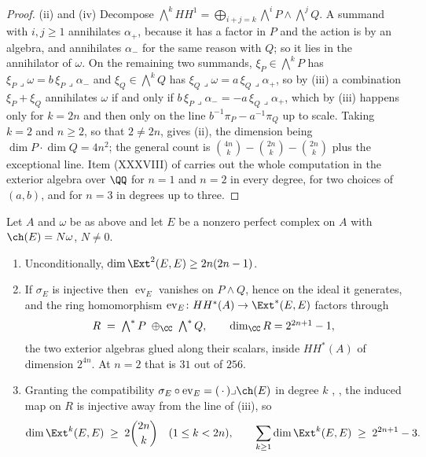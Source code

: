 \begin{proof}
(ii) and (iv) Decompose $\bigwedge^{k}HH^{1}=\bigoplus_{i+j=k}\bigwedge^{i}P
\wedge\bigwedge^{j}Q$. A summand with $i,j\ge1$ annihilates $\alpha_{+}$,
because it has a factor in $P$ and the action is by an algebra, and
annihilates $\alpha_{-}$ for the same reason with $Q$; so it lies in the
annihilator of $\omega$. On the remaining two summands, $\xi_{P}\in\bigwedge^{k}P$
has $\xi_{P}\lrcorner\omega=b\,\xi_{P}\lrcorner\alpha_{-}$ and
$\xi_{Q}\in\bigwedge^{k}Q$ has $\xi_{Q}\lrcorner\omega=a\,\xi_{Q}\lrcorner\alpha_{+}$,
so by (iii) a combination $\xi_{P}+\xi_{Q}$ annihilates $\omega$ if and only
if $b\,\xi_{P}\lrcorner\alpha_{-}=-a\,\xi_{Q}\lrcorner\alpha_{+}$, which by
(iii) happens only for $k=2n$ and then only on the line
$b^{-1}\pi_{P}-a^{-1}\pi_{Q}$ up to scale. Taking $k=2$ and $n\ge2$, so that
$2\ne2n$, gives (ii), the dimension being
$\dim P\cdot\dim Q=4n^{2}$; the general count is
$\binom{4n}{k}-\binom{2n}{k}-\binom{2n}{k}$ plus the exceptional line. Item
(XXXVIII) of  carries out the whole computation in the
exterior algebra over $\QQ$ for $n=1$ and $n=2$ in every degree, for two
choices of $(a,b)$, and for $n=3$ in degrees up to three.
\end{proof}

\begin{corollary}
\label{cor:hhfactor}
Let $A$ and $\omega$ be as above and let $E$ be a nonzero perfect complex on
$A$ with $\ch(E)=N\omega$, $N\ne0$.
\begin{enumerate}[label=\textup{(\roman*)},leftmargin=2.6em,itemsep=2pt]
\item Unconditionally, $\dim\Ext^{2}(E,E)\ge2n(2n-1)$.
\item If $\sigma_{E}$ is injective then $\operatorname{ev}_{E}$ vanishes on
  $P\wedge Q$, hence on the ideal it generates, and the ring homomorphism
  $\operatorname{ev}_{E}\colon HH^{*}(A)\to\Ext^{*}(E,E)$ factors through
  \[
    R\;=\;\textstyle\bigwedge^{*}P\;\oplus_{\CC}\;\bigwedge^{*}Q,
    \qquad \dim_{\CC}R=2^{2n+1}-1,
  \]
  the two exterior algebras glued along their scalars, inside $HH^{*}(A)$ of
  dimension $2^{4n}$. At $n=2$ that is $31$ out of $256$.
\item Granting the compatibility
  $\sigma_{E}\circ\operatorname{ev}_{E}=(\,\cdot\,)\lrcorner\ch(E)$ in degree
  $k$ \cite{Cal05}, \cite{CRV12}, the induced map on $R$ is injective away
  from the line of (iii), so
  \[
    \dim\Ext^{k}(E,E)\;\ge\;2\binom{2n}{k}\quad(1\le k<2n),
    \qquad
    \sum_{k\ge1}\dim\Ext^{k}(E,E)\;\ge\;2^{2n+1}-3 .
  \]
\end{enumerate}
\end{corollary}

